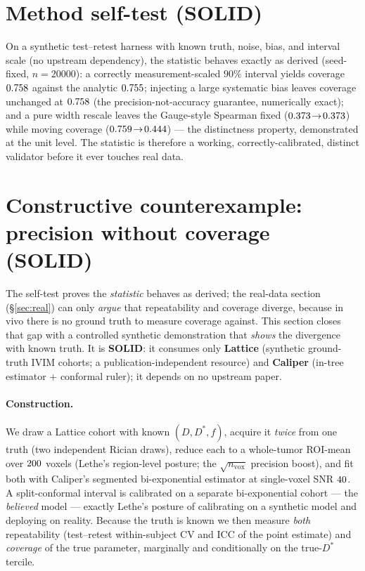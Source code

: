 \documentclass[11pt]{article}
\newcommand{\Dstar}{D^{*}}
\begin{document}
\section{Method self-test (SOLID)}\label{sec:selftest}
On a synthetic test--retest harness with known truth, noise, bias, and interval scale (no
upstream dependency), the statistic behaves exactly as derived (seed-fixed, $n{=}20000$):
a correctly measurement-scaled $90\%$ interval yields coverage $0.758$ against the
analytic $0.755$; injecting a large systematic bias leaves coverage unchanged at
$0.758$ (the precision-not-accuracy guarantee, numerically exact); and a pure width
rescale leaves the Gauge-style Spearman fixed ($0.373\!\to\!0.373$) while
moving coverage ($0.759\!\to\!0.444$) --- the distinctness property,
demonstrated at the unit level. The statistic is therefore a working, correctly-calibrated,
distinct validator before it ever touches real data.

\section{Constructive counterexample: precision without coverage (SOLID)}\label{sec:reverb}
The self-test proves the \emph{statistic} behaves as derived; the real-data section
(\S\ref{sec:real}) can only \emph{argue} that repeatability and coverage diverge, because in
vivo there is no ground truth to measure coverage against. This section closes that gap with a
controlled synthetic demonstration that \emph{shows} the divergence with known truth. It is
\textbf{SOLID}: it consumes only \textbf{Lattice} (synthetic ground-truth IVIM cohorts; a
publication-independent resource) and \textbf{Caliper} (in-tree estimator + conformal ruler);
it depends on no upstream paper.

\paragraph{Construction.} We draw a Lattice cohort with known $(D,\Dstar,f)$, acquire it
\emph{twice} from one truth (two independent Rician draws), reduce each to a whole-tumor
ROI-mean over $200$ voxels (Lethe's region-level posture; the $\sqrt{n_{\mathrm{vox}}}$
precision boost), and fit both with Caliper's segmented bi-exponential estimator at single-voxel
SNR $40$. A split-conformal interval is calibrated on a separate bi-exponential cohort
--- the \emph{believed} model --- exactly Lethe's posture of calibrating on a synthetic model and
deploying on reality. Because the truth is known we then measure \emph{both} repeatability
(test--retest within-subject CV and ICC of the point estimate) and \emph{coverage} of the true
parameter, marginally and conditionally on the true-$\Dstar$ tercile.
\end{document}
